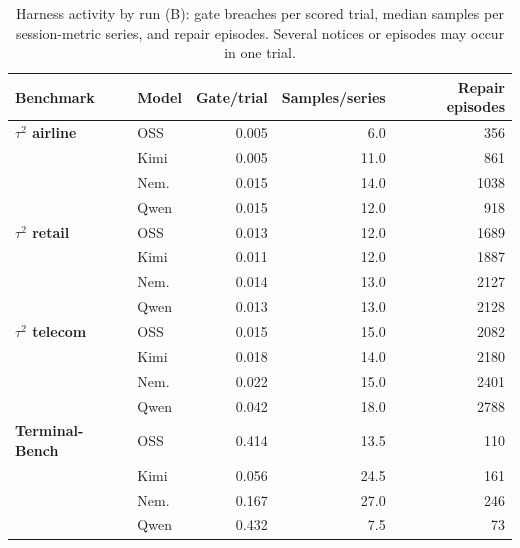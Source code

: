 \documentclass[11pt,letterpaper]{article}
\begin{document}
\begin{table}[H]
\ContinuedFloat
\centering\small
\setlength{\tabcolsep}{3pt}
\caption{Harness activity by run (B): gate breaches per scored trial,
median samples per session-metric series, and repair episodes.
Several notices or episodes may occur in one trial.}
\label{tab:telemetry-b}
\begin{tabular*}{\linewidth}{@{\extracolsep{\fill}}llrrr@{}}
\toprule
Benchmark & Model & Gate/trial & Samples/series & Repair episodes \\
\midrule
\textbf{$\tau^2$ airline} & OSS & 0.005 & 6.0 & 356 \\
 & Kimi & 0.005 & 11.0 & 861 \\
 & Nem. & 0.015 & 14.0 & 1038 \\
 & Qwen & 0.015 & 12.0 & 918 \\
\midrule
\textbf{$\tau^2$ retail} & OSS & 0.013 & 12.0 & 1689 \\
 & Kimi & 0.011 & 12.0 & 1887 \\
 & Nem. & 0.014 & 13.0 & 2127 \\
 & Qwen & 0.013 & 13.0 & 2128 \\
\midrule
\textbf{$\tau^2$ telecom} & OSS & 0.015 & 15.0 & 2082 \\
 & Kimi & 0.018 & 14.0 & 2180 \\
 & Nem. & 0.022 & 15.0 & 2401 \\
 & Qwen & 0.042 & 18.0 & 2788 \\
\midrule
\textbf{Terminal-Bench} & OSS & 0.414 & 13.5 & 110 \\
 & Kimi & 0.056 & 24.5 & 161 \\
 & Nem. & 0.167 & 27.0 & 246 \\
 & Qwen & 0.432 & 7.5 & 73 \\
\bottomrule
\end{tabular*}
\end{table}
\end{document}
